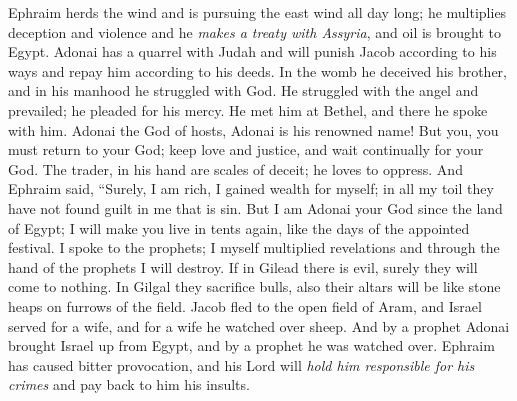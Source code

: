 \begin{biblechapter} %
\verse Ephraim herds the wind 
and is pursuing the east wind all day long; 
he multiplies deception and violence 
and he \textit{makes a treaty with Assyria}, 
and oil is brought to Egypt.
\verse Adonai has a quarrel with Judah 
and will punish Jacob according to his ways 
and repay him according to his deeds.
\verse In the womb he deceived his brother, 
and in his manhood he struggled with God.
\verse He struggled with the angel and prevailed; 
he pleaded for his mercy. 
He met him at Bethel, 
and there he spoke with him.
\verse Adonai the God of hosts, 
Adonai is his renowned name!
\verse But you, you must return to your God; 
keep love and justice, 
and wait continually for your God.
\verse The trader, in his hand are scales of deceit; 
he loves to oppress.
\verse And Ephraim said, “Surely, I am rich, 
I gained wealth for myself; 
in all my toil they have not found guilt in me 
that is sin.
\verse But I am Adonai your God 
since the land of Egypt; 
I will make you live in tents again, 
like the days of the appointed festival.
\verse I spoke to the prophets; 
I myself multiplied revelations 
and through the hand of the prophets I will destroy.
\verse If in Gilead there is evil, 
surely they will come to nothing. 
In Gilgal they sacrifice bulls, 
also their altars will be like stone heaps 
on furrows of the field.
\verse Jacob fled to the open field of Aram, 
and Israel served for a wife, 
and for a wife he watched over sheep.
\verse And by a prophet Adonai brought 
Israel up from Egypt, 
and by a prophet 
he was watched over.
\verse Ephraim has caused bitter provocation, 
and his Lord will \textit{hold him responsible for his crimes} 
and pay back to him his insults.
\end{biblechapter}

